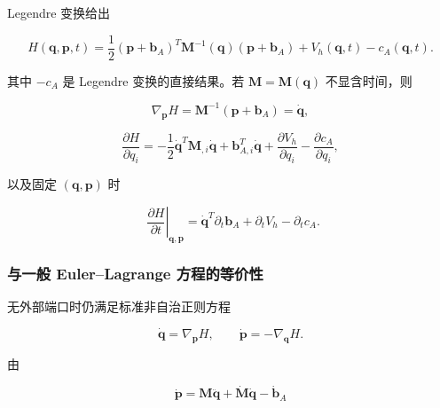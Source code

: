 Legendre 变换给出

\begin{equation}
\label{eq:hamiltonian-3-45}
\boxed{H\left( \mathbf{q},\mathbf{p},t \right) = \frac{1}{2}\left( \mathbf{p} + \mathbf{b}_{A} \right)^{T}\mathbf{M}^{- 1}\left( \mathbf{q} \right)\left( \mathbf{p} + \mathbf{b}_{A} \right) + V_{h}\left( \mathbf{q},t \right) - c_{A}\left( \mathbf{q},t \right).}
\end{equation}

其中 \(- c_{A}\) 是 Legendre 变换的直接结果。若 \(\mathbf{M} = \mathbf{M}\left( \mathbf{q} \right)\) 不显含时间，则

\begin{equation}
\label{eq:hamiltonian-3-46}
\boxed{\nabla_{\mathbf{p}}H = \mathbf{M}^{- 1}\left( \mathbf{p} + \mathbf{b}_{A} \right) = \dot{\mathbf{q}},}
\end{equation}

\begin{equation}
\label{eq:hamiltonian-3-47}
\boxed{\frac{\partial H}{\partial q_{i}} = - \frac{1}{2}{\dot{\mathbf{q}}}^{T}\mathbf{M}_{,i}\dot{\mathbf{q}} + \mathbf{b}_{A,i}^{T}\dot{\mathbf{q}} + \frac{\partial V_{h}}{\partial q_{i}} - \frac{\partial c_{A}}{\partial q_{i}},}
\end{equation}

以及固定 \(\left( \mathbf{q},\mathbf{p} \right)\) 时

\begin{equation}
\label{eq:hamiltonian-3-48}
\boxed{\left. \ \ \frac{\partial H}{\partial t} \right|_{\mathbf{q},\mathbf{p}} = {\dot{\mathbf{q}}}^{T}\partial_{t}\mathbf{b}_{A} + \partial_{t}V_{h} - \partial_{t}c_{A}.}
\end{equation}

\subsubsection{与一般 Euler--Lagrange 方程的等价性}\label{sec:hamiltonian-3-5-3}

无外部端口时仍满足标准非自治正则方程

\begin{equation}
\label{eq:hamiltonian-3-49}
\dot{\mathbf{q}} = \nabla_{\mathbf{p}}H,\quad\quad\dot{\mathbf{p}} = - \nabla_{\mathbf{q}}H.
\end{equation}

由

\begin{equation}
\label{eq:hamiltonian-3-50}
\dot{\mathbf{p}} = \mathbf{M}\ddot{\mathbf{q}} + \dot{\mathbf{M}}\dot{\mathbf{q}} - {\dot{\mathbf{b}}}_{A}
\end{equation}

